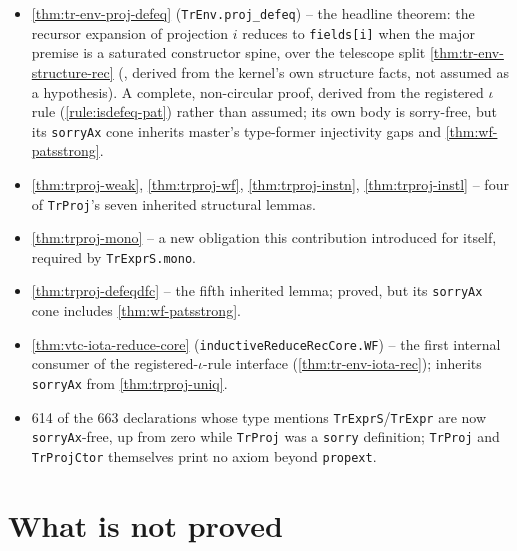 \begin{itemize}
\item \stTainted{} \ref{thm:tr-env-proj-defeq} (\texttt{TrEnv.proj\_defeq}) -- the headline
theorem: the recursor expansion of projection $i$ reduces to \texttt{fields[i]} when the major
premise is a saturated constructor spine, over the telescope split \ref{thm:tr-env-structure-rec}
(\stProved{}, derived from the kernel's own structure facts, not assumed as a hypothesis). A
complete, non-circular proof, derived from the registered $\iota$ rule (\ref{rule:isdefeq-pat})
rather than assumed; its own body is sorry-free, but its \texttt{sorryAx} cone inherits master's
type-former injectivity gaps and \ref{thm:wf-patsstrong}.
\item \stProved{} \ref{thm:trproj-weak}, \ref{thm:trproj-wf}, \ref{thm:trproj-instn},
\ref{thm:trproj-instl} -- four of \texttt{TrProj}'s seven inherited structural lemmas.
\item \stProved{} \ref{thm:trproj-mono} -- a new obligation this contribution introduced for
itself, required by \texttt{TrExprS.mono}.
\item \stTainted{} \ref{thm:trproj-defeqdfc} -- the fifth inherited lemma; proved, but its
\texttt{sorryAx} cone includes \ref{thm:wf-patsstrong}.
\item \stTainted{} \ref{thm:vtc-iota-reduce-core} (\texttt{inductiveReduceRecCore.WF}) -- the first
internal consumer of the registered-$\iota$-rule interface (\ref{thm:tr-env-iota-rec}); inherits
\texttt{sorryAx} from \ref{thm:trproj-uniq}.
\item \stProved{} 614 of the 663 declarations whose type mentions \texttt{TrExprS}/\texttt{TrExpr}
are now \texttt{sorryAx}-free, up from zero while \texttt{TrProj} was a \texttt{sorry} definition;
\texttt{TrProj} and \texttt{TrProjCtor} themselves print no axiom beyond \texttt{propext}.
\end{itemize}

\section{What is not proved}

